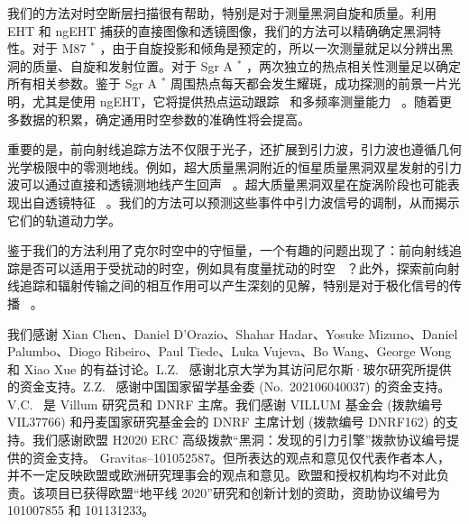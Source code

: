 \documentclass[aps,reprint,superscriptaddress,nofootinbib,floatfix,longbibliography,preprintnumbers]{revtex4-1}
\begin{document}
我们的方法对时空断层扫描很有帮助，特别是对于测量黑洞自旋和质量。利用 EHT 和 ngEHT 捕获的直接图像和透镜图像，我们的方法可以精确确定黑洞特性。对于 M87    $^*$    ，由于自旋投影和倾角是预定的，所以一次测量就足以分辨出黑洞的质量、自旋和发射位置。对于 Sgr A    $^*$    ，两次独立的热点相关性测量足以确定所有相关参数。鉴于 Sgr A    $^*$    周围热点每天都会发生耀斑，成功探测的前景一片光明，尤其是使用 ngEHT，它将提供热点运动跟踪~    \cite{Emami:2022ydq}    和多频率测量能力~    \cite{Chael:2022meh}    。随着更多数据的积累，确定通用时空参数的准确性将会提高。  

重要的是，前向射线追踪方法不仅限于光子，还扩展到引力波，引力波也遵循几何光学极限中的零测地线。例如，超大质量黑洞附近的恒星质量黑洞双星发射的引力波可以通过直接和透镜测地线产生回声~    \cite{Chen:2017xbi,DOrazio:2019fbq,Gondan:2021fpr,Basak:2022fig,Savastano:2022jjv,Zhang:2024ibf,Kubota:2024zkv}    。超大质量黑洞双星在旋涡阶段也可能表现出自透镜特征~    \cite{DOrazio:2017ssb, Ingram:2021gar, Kelley:2021yfc}    。我们的方法可以预测这些事件中引力波信号的调制，从而揭示它们的轨道动力学。  

鉴于我们的方法利用了克尔时空中的守恒量，一个有趣的问题出现了：前向射线追踪是否可以适用于受扰动的时空，例如具有度量扰动的时空~    \cite{Giddings:2016btb, Giddings:2019jwy, Wang:2019skw, Chen:2022kzv, Zhu:2023omf,Zhong:2024ysg}    ？此外，探索前向射线追踪和辐射传输之间的相互作用可以产生深刻的见解，特别是对于极化信号的传播~    \cite{Chen:2019fsq, Himwich:2020msm, Chen:2021lvo, Chen:2022oad}    。  

   \hspace{5mm}    
   \begin{acknowledgments}我们感谢 Xian Chen、Daniel D'Orazio、Shahar Hadar、Yosuke Mizuno、Daniel Palumbo、Diogo Ribeiro、Paul Tiede、Luka Vujeva、Bo Wang、George Wong 和 Xiao Xue 的有益讨论。L.Z. \  感谢北京大学为其访问尼尔斯·玻尔研究所提供的资金支持。Z.Z. \  感谢中国国家留学基金委 (No.~202106040037) 的资金支持。V.C. \  是 Villum 研究员和 DNRF 主席。我们感谢 VILLUM 基金会 (拨款编号 VIL37766) 和丹麦国家研究基金会的 DNRF 主席计划 (拨款编号 DNRF162) 的支持。我们感谢欧盟 H2020 ERC 高级拨款“黑洞：发现的引力引擎”拨款协议编号提供的资金支持。 Gravitas–101052587。但所表达的观点和意见仅代表作者本人，并不一定反映欧盟或欧洲研究理事会的观点和意见。欧盟和授权机构均不对此负责。该项目已获得欧盟“地平线 2020”研究和创新计划的资助，资助协议编号为 101007855 和 101131233。  \end{acknowledgments}     
\end{document}
